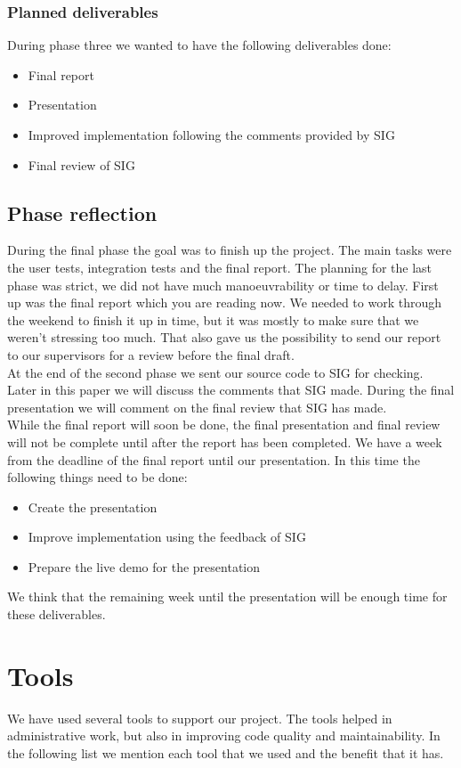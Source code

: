 \subsubsection{Planned deliverables}
During phase three we wanted to have the following deliverables done:
\begin{itemize}
\item Final report
\item Presentation
\item Improved implementation following the comments provided by SIG
\item Final review of SIG
\end{itemize}

\subsection{Phase reflection}
During the final phase the goal was to finish up the project.
The main tasks were the user tests, integration tests and the final report.
The planning for the last phase was strict, we did not have much manoeuvrability or time to delay.
First up was the final report which you are reading now.
We needed to work through the weekend to finish it up in time, but it was mostly to make sure that we weren't stressing too much.
That also gave us the possibility to send our report to our supervisors for a review before the final draft.\\
At the end of the second phase we sent our source code to SIG for checking.
Later in this paper we will discuss the comments that SIG made.
During the final presentation we will comment on the final review that SIG has made.\\
While the final report will soon be done, the final presentation and final review will not be complete until after the report has been completed.
We have a week from the deadline of the final report until our presentation.
In this time the following things need to be done:
\begin{itemize}
\item Create the presentation
\item Improve implementation using the feedback of SIG
\item Prepare the live demo for the presentation
\end{itemize}
We think that the remaining week until the presentation will be enough time for these deliverables.

\section{Tools}
We have used several tools to support our project.
The tools helped in administrative work, but also in improving code quality and maintainability.
In the following list we mention each tool that we used and the benefit that it has.


